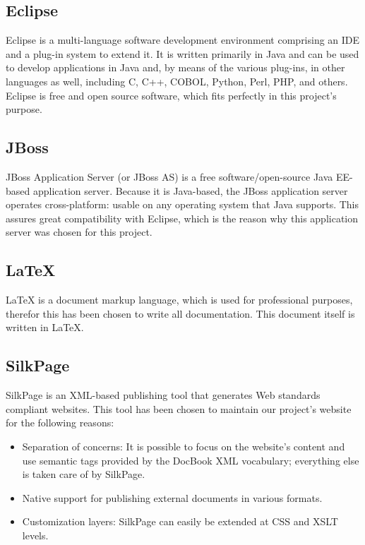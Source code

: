 \subsection{Eclipse}
Eclipse is a multi-language software development environment comprising an IDE and a plug-in system to extend it.
It is written primarily in Java and can be used to develop applications in Java and, by means of the various plug-ins, in other languages as well, including C, C++, COBOL, Python, Perl, PHP, and others.
Eclipse is free and open source software, which fits perfectly in this project's purpose.

\subsection{JBoss}
JBoss Application Server (or JBoss AS) is a free software/open-source Java EE-based application server. Because it is Java-based, the JBoss application server operates cross-platform: usable on any operating system that Java supports. This assures great compatibility with Eclipse, which is the reason why this application server was chosen for this project.

\subsection{LaTeX}
LaTeX is a document markup language, which is used for professional purposes, therefor this has been chosen to write all documentation. This document itself is written in LaTeX.

\subsection{SilkPage}
SilkPage is an XML-based publishing tool that generates Web standards 
compliant websites. This tool has been chosen to maintain our project's website 
for the following reasons:

\begin{itemize}
\item Separation of concerns: It is possible to focus on the website's content 
  and use semantic tags provided by the DocBook XML vocabulary; 
  everything else is taken care of by SilkPage.
\item Native support for publishing external documents in various formats.
\item Customization layers: SilkPage can easily be extended at CSS and
  XSLT levels.

\end{itemize}

